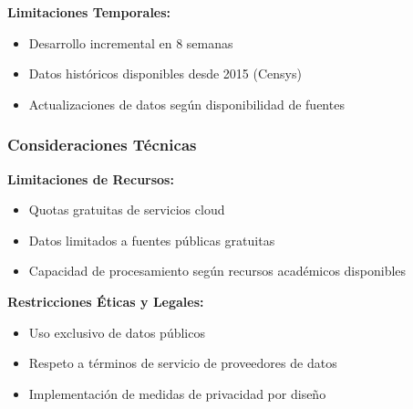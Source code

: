 \textbf{Limitaciones Temporales:}
\begin{itemize}
    \item Desarrollo incremental en 8 semanas
    \item Datos históricos disponibles desde 2015 (Censys)
    \item Actualizaciones de datos según disponibilidad de fuentes
\end{itemize}

\subsubsection{Consideraciones Técnicas}

\textbf{Limitaciones de Recursos:}
\begin{itemize}
    \item Quotas gratuitas de servicios cloud
    \item Datos limitados a fuentes públicas gratuitas
    \item Capacidad de procesamiento según recursos académicos disponibles
\end{itemize}

\textbf{Restricciones Éticas y Legales:}
\begin{itemize}
    \item Uso exclusivo de datos públicos
    \item Respeto a términos de servicio de proveedores de datos
    \item Implementación de medidas de privacidad por diseño
\end{itemize}


